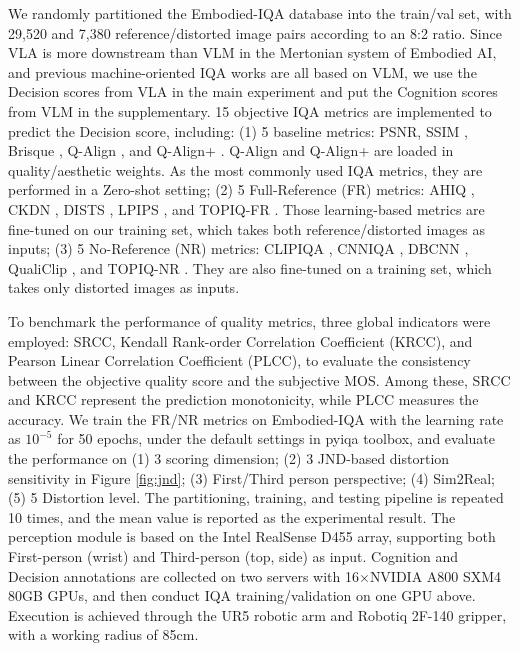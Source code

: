 \documentclass{article}
\begin{document}
We randomly partitioned the Embodied-IQA database into the train/val set, with 29,520 and 7,380 reference/distorted image pairs according to an 8:2 ratio. 
Since VLA is more downstream than VLM in the Mertonian system of Embodied AI, and previous machine-oriented IQA works are all based on VLM, we use the Decision scores from VLA in the main experiment and put the Cognition scores from VLM in the supplementary.
15 objective IQA metrics are implemented to predict the Decision score, including:
(1) 5 baseline metrics: PSNR, SSIM \cite{quality:ssim}, Brisque \cite{quality:brisque}, Q-Align \cite{quality:q-align}, and Q-Align+ \cite{quality:q-align+}. Q-Align and Q-Align+ are loaded in quality/aesthetic weights. As the most commonly used IQA metrics, they are performed in a Zero-shot setting; 
(2) 5 Full-Reference (FR) metrics: AHIQ \cite{quality:ahiq}, CKDN \cite{quality:ckdn}, DISTS \cite{quality:dists}, LPIPS \cite{quality:lpips}, and TOPIQ-FR \cite{quality:topiq}. Those learning-based metrics are fine-tuned on our training set, which takes both reference/distorted images as inputs;
(3) 5 No-Reference (NR) metrics: CLIPIQA \cite{quality:CLIPIQA}, CNNIQA \cite{quality:CNNIQA}, DBCNN \cite{quality:DBCNN}, QualiClip \cite{quality:qualiclip}, and TOPIQ-NR \cite{quality:topiq}. They are also fine-tuned on a training set, which takes only distorted images as inputs.

To benchmark the performance of quality metrics, three global indicators were employed: SRCC, Kendall Rank-order Correlation Coefficient (KRCC), and Pearson Linear Correlation Coefficient (PLCC), to evaluate the consistency between the objective quality score and the subjective MOS. Among these, SRCC and KRCC represent the prediction monotonicity, while PLCC measures the accuracy.
We train the FR/NR metrics on Embodied-IQA with the learning rate as $10^{-5}$ for 50 epochs, under the default settings in pyiqa toolbox, and evaluate the performance on (1) 3 scoring dimension; (2) 3 JND-based distortion sensitivity in Figure \ref{fig:jnd}; (3) First/Third person perspective; (4) Sim2Real; (5) 5 Distortion level. 
The partitioning, training, and testing pipeline is repeated 10 times, and the mean value is reported as the experimental result.
The perception module is based on the Intel RealSense D455 array, supporting both First-person (wrist) and Third-person (top, side) as input.
Cognition and Decision annotations are collected on two servers with 16$\times$NVIDIA A800 SXM4 80GB GPUs, and then conduct IQA training/validation on one GPU above.
Execution is achieved through the UR5 robotic arm and Robotiq 2F-140 gripper, with a working radius of 85cm.
\end{document}
